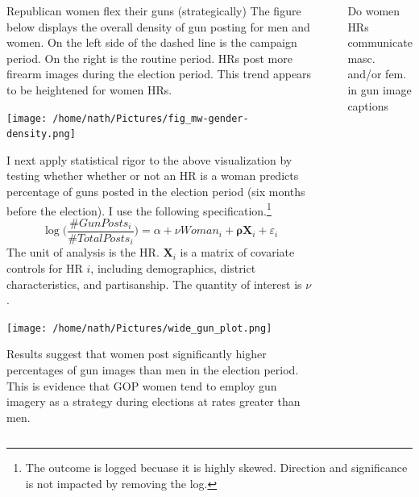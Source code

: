 \documentclass[final]{beamer}
\newlength{\sepwidth}
\newlength{\colwidth}
\newcommand{\separatorcolumn}{\begin{column}{\sepwidth}\end{column}}
\begin{document}
\begin{frame}[t]
\begin{columns}[t]
\begin{column}{\colwidth}
\begin{block}{Republican women flex their guns (strategically)}
The figure below displays the overall density of gun posting for men and women. On the left side of the dashed line is the campaign period. On the right is the routine period. HRs post more firearm images during the election period. This trend appears to be heightened for women HRs. 
\begin{center}
\texttt{[image: /home/nath/Pictures/fig\_mw-gender-density.png]}
\end{center}
I next apply statistical rigor to the above visualization by testing whether whether or not an HR is a woman predicts percentage of guns posted in the election period (six months before the election). I use the following specification.\footnote{\footnotesize{The outcome is logged becuase it is highly skewed. Direction and significance is not impacted by removing the log.}} $$\log\bigg(\frac{\#\textit{GunPosts}_i}{\#\textit{TotalPosts}_i}\bigg) = \alpha + \nu \textit{Woman}_i + \boldsymbol{\rho} \boldsymbol{X}_i  + \varepsilon_i$$ %
The unit of analysis is the HR. $\boldsymbol{X}_i$ is a matrix of covariate controls for HR $i$, including demographics, district characteristics, and partisanship. The quantity of interest is $\nu$.
\begin{center}
\texttt{[image: /home/nath/Pictures/wide\_gun\_plot.png]}
\end{center}
\end{block}
Results suggest that women post significantly higher percentages of gun images than men in the election period. This is evidence that GOP women tend to employ gun imagery as a strategy during elections at rates greater than men.
\end{column}

\separatorcolumn

\begin{column}{\colwidth}

\begin{block}{Do women HRs communicate masc. and/or fem. in gun image captions}



\end{block}
\end{column}
\end{columns}
\end{frame}
\end{document}
